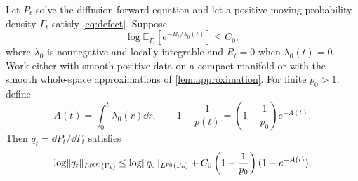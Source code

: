 \documentclass[11pt,reqno]{amsart}
\numberwithin{equation}{section}
\theoremstyle{plain}
\theoremstyle{remark}
\DeclarePairedDelimiter{\norm}{\lVert}{\rVert}
\newcommand{\E}{\mathbb E}\newcommand{\Q}{\mathbb Q}\newcommand{\Pb}{\mathbb P}
\begin{document}
\begin{prop}\label{prop:decreasing}
Let $P_t$ solve the diffusion forward equation and let a positive moving probability density $\Gamma_t$ satisfy \eqref{eq:defect}. Suppose
\begin{equation}\label{eq:abstract-exponential}
 \log\E_{\Gamma_t}[e^{-R_t/\lambda_0(t)}]\le C_0,
\end{equation}
where $\lambda_0$ is nonnegative and locally integrable and $R_t=0$ when $\lambda_0(t)=0$. Work either with smooth positive data on a compact manifold or with the smooth whole-space approximations of \cref{lem:approximation}. For finite $p_0>1$, define
\begin{equation}\label{eq:exponent-ode}
 A(t)=\int_0^t\lambda_0(r)\dd r,\qquad
 1-\frac1{p(t)}=\left(1-\frac1{p_0}\right)e^{-A(t)}.
\end{equation}
Then $q_t=\dd P_t/\dd\Gamma_t$ satisfies
\begin{equation}\label{eq:varying-bound}
 \log\norm{q_t}_{L^{p(t)}(\Gamma_t)}
 \le\log\norm{q_0}_{L^{p_0}(\Gamma_0)}
       +C_0\left(1-\frac1{p_0}\right)(1-e^{-A(t)}).
\end{equation}
\end{prop}
\end{document}
